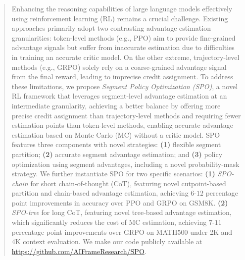 \begin{abstract}

Enhancing the reasoning capabilities of large language models effectively using reinforcement learning (RL) remains a crucial challenge. Existing approaches primarily adopt two contrasting advantage estimation granularities: token-level methods (e.g., PPO) aim to provide fine-grained advantage signals but suffer from inaccurate estimation due to difficulties in training an accurate critic model. On the other extreme, trajectory-level methods (e.g., GRPO) solely rely on a coarse-grained advantage signal from the final reward, leading to imprecise credit assignment. To address these limitations, we propose \emph{Segment Policy Optimization (SPO)}, a novel RL framework that leverages segment-level advantage estimation at an intermediate granularity, achieving a better balance by offering more precise credit assignment than trajectory-level methods and requiring fewer estimation points than token-level methods, enabling accurate advantage estimation based on Monte Carlo (MC) without a critic model. SPO features three components with novel strategies: \textbf{(1)} flexible segment partition; \textbf{(2)} accurate segment advantage estimation; and \textbf{(3)} policy optimization using segment advantages, including a novel probability-mask strategy. We further instantiate SPO for two specific scenarios: \textbf{(1)} \emph{SPO-chain} for short chain-of-thought (CoT), featuring novel cutpoint-based partition and chain-based advantage estimation, achieving $6$-$12$ percentage point improvements in accuracy over PPO and GRPO on GSM8K. \textbf{(2)} \emph{SPO-tree} for long CoT, featuring novel tree-based advantage estimation, which significantly reduces the cost of MC estimation, achieving $7$-$11$ percentage point improvements over GRPO on MATH500 under 2K and 4K context evaluation. We make our code publicly available at \url{https://github.com/AIFrameResearch/SPO}.
    
\end{abstract}